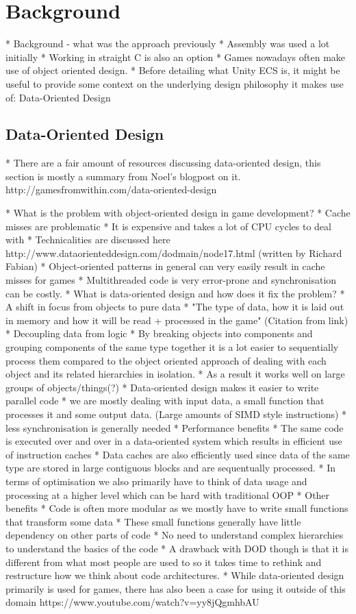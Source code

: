 \section{Background}
* Background - what was the approach previously
  * Assembly was used a lot initially
  * Working in straight C is also an option
  * Games nowadays often make use of object oriented design.
* Before detailing what Unity ECS is, it might be useful to provide some context on the underlying design philosophy it makes use of: Data-Oriented Design

\subsection{Data-Oriented Design}
* There are a fair amount of resources discussing data-oriented design, this section is mostly a summary from Noel's blogpost on it. http://gamesfromwithin.com/data-oriented-design

* What is the problem with object-oriented design in game development?
   * Cache misses are problematic
      * It is expensive and takes a lot of CPU cycles to deal with
      * Technicalities are discussed here http://www.dataorienteddesign.com/dodmain/node17.html (written by Richard Fabian)
      * Object-oriented patterns in general can very easily result in cache misses for games
   * Multithreaded code is very error-prone and synchronisation can be costly. 
* What is data-oriented design and how does it fix the problem? 
   * A shift in focus from objects to pure data
      * "The type of data, how it is laid out in memory and how it will be read + processed in the game" (Citation from link)
      * Decoupling data from logic
   * By breaking objects into components and grouping components of the same type together it is a lot easier to sequentially process them compared to the object oriented approach of dealing with each object and its related hierarchies in isolation. 
   * As a result it works well on large groups of objects/things(?)
   * Data-oriented design makes it easier to write parallel code
      * we are mostly dealing with input data, a small function that processes it and some output data. (Large amounts of SIMD style instructions)
      * less synchronisation is generally needed
   * Performance benefits
    * The same code is executed over and over in a data-oriented system which results in efficient use of instruction caches
    * Data caches are also efficiently used since data of the same type are stored in large contiguous blocks and are sequentually processed. 
    * In terms of optimisation we also primarily have to think of data usage and processing at a higher level which can be hard with traditional OOP
   * Other benefits
    * Code is often more modular as we mostly have to write small functions that transform some data
       * These small functions generally have little dependency on other parts of code
       * No need to understand complex hierarchies to understand the basics of the code
   * A drawback with DOD though is that it is different from what most people are used to so it takes time to rethink and restructure how we think about code architectures. 
   * While data-oriented design primarily is used for games, there has also been a case for using it outside of this domain https://www.youtube.com/watch?v=yy8jQgmhbAU

